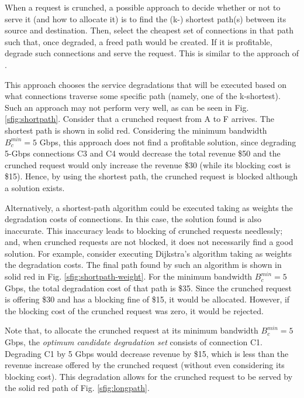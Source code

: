 \documentclass[journal]{IEEEtran}
\begin{document}
When a request is crunched, a possible approach to decide whether or not to serve it (and how to allocate it) is to find the (k-) shortest path(s) between its source and destination. Then, select the cheapest set of connections in that path such that, once degraded, a freed path would be created. If it is profitable, degrade such connections and serve the request. This is similar to the approach of \cite{savas2016backup, roy2014network, 7842043}.

This approach chooses the service degradations that will be executed based on what connections traverse some specific path (namely, one of the k-shortest). Such an approach may not perform very well, as can be seen in Fig. \ref{sfig:shortpath}. Consider that a crunched request from A to F arrives. The shortest path is shown in solid red. Considering the minimum bandwidth $B_{c}^{min} = 5$ Gbps, this approach does not find a profitable solution, since degrading 5-Gbps connections C3 and C4 would decrease the total revenue \$50 and the crunched request would only increase the revenue \$30 (while its blocking cost is \$15). Hence, by using the shortest path, the crunched request is blocked although a solution exists.

Alternatively, a shortest-path algorithm could be executed taking as weights the degradation costs of connections. In this case, the solution found is also inaccurate. This inaccuracy leads to blocking of crunched requests needlessly; and, when crunched requests are not blocked, it does not necessarily find a good solution. For example, consider executing Dijkstra's algorithm taking as weights the degradation costs. The final path found by such an algorithm is shown in solid red in Fig. \ref{sfig:shortpath-weight}. For the minimum bandwidth $B_{c}^{min} = 5$ Gbps, the total degradation cost of that path is \$35. Since the crunched request is offering \$30 and has a blocking fine of \$15, it would be allocated. However, if the blocking cost of the crunched request was zero, it would be rejected.

Note that, to allocate the crunched request at its minimum bandwidth $B_{c}^{min} = 5$ Gbps, the \textit{optimum candidate degradation set} consists of connection C1. Degrading C1 by 5 Gbps would decrease revenue by \$15, which is less than the revenue increase offered by the crunched request (without even considering its blocking cost). This degradation allows for the crunched request to be served by the solid red path of Fig. \ref{sfig:longpath}. %
\end{document}
